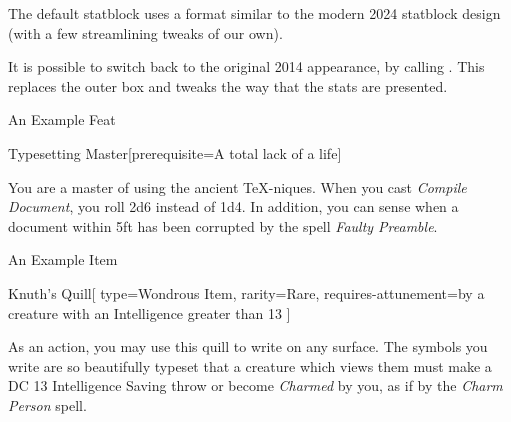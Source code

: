\documentclass[theme=dnd,size=10pt,columns=2,justified]{rpgbook}
\begin{document}
				The default statblock uses a format similar to the modern 2024 statblock design (with a few streamlining tweaks of our own).

				It is possible to switch back to the original 2014 appearance, by calling  . This replaces the outer box and tweaks the way that the stats are presented.
				\begin{RpgTip}{An Example Feat}
					\begin{RpgFeat}{Typesetting Master}[prerequisite={A total lack of a life}]

						You are a master of using the ancient \TeX-niques. When you cast \textit{Compile Document}, you roll 2d6 instead of 1d4. In addition, you can sense when a document within 5ft has been corrupted by the spell \textit{Faulty Preamble}.
					\end{RpgFeat}
				\end{RpgTip}
				\begin{RpgTip}{An Example Item}
					\begin{RpgItem}{Knuth's Quill}[
							type={Wondrous Item},
							rarity={Rare},
							requires-attunement={by a creature with an Intelligence greater than 13}
						]

						As an action, you may use this quill to write on any surface. The symbols you write are so beautifully typeset that a creature which views them must make a DC 13 Intelligence Saving throw or become \textit{Charmed} by you, as if by the \textit{Charm Person} spell.
					\end{RpgItem}
				\end{RpgTip}
\end{document}
